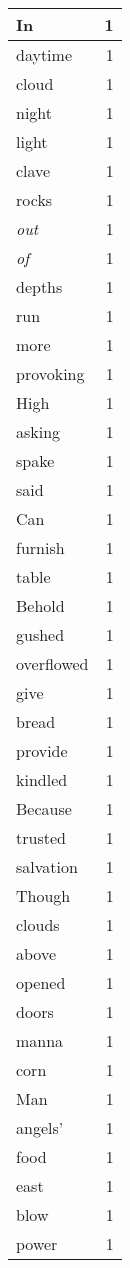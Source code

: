 \begin{center}
\begin{longtable}{l|r}
In & 1\\ \hline 
daytime & 1\\ \hline 
cloud & 1\\ \hline 
night & 1\\ \hline 
light & 1\\ \hline 
clave & 1\\ \hline 
rocks & 1\\ \hline 
\emph{out} & 1\\ \hline 
\emph{of} & 1\\ \hline 
depths & 1\\ \hline 
run & 1\\ \hline 
more & 1\\ \hline 
provoking & 1\\ \hline 
High & 1\\ \hline 
asking & 1\\ \hline 
spake & 1\\ \hline 
said & 1\\ \hline 
Can & 1\\ \hline 
furnish & 1\\ \hline 
table & 1\\ \hline 
Behold & 1\\ \hline 
gushed & 1\\ \hline 
overflowed & 1\\ \hline 
give & 1\\ \hline 
bread & 1\\ \hline 
provide & 1\\ \hline 
kindled & 1\\ \hline 
Because & 1\\ \hline 
trusted & 1\\ \hline 
salvation & 1\\ \hline 
Though & 1\\ \hline 
clouds & 1\\ \hline 
above & 1\\ \hline 
opened & 1\\ \hline 
doors & 1\\ \hline 
manna & 1\\ \hline 
corn & 1\\ \hline 
Man & 1\\ \hline 
angels' & 1\\ \hline 
food & 1\\ \hline 
east & 1\\ \hline 
blow & 1\\ \hline 
power & 1\\ \hline 

\end{longtable}
\end{center}
